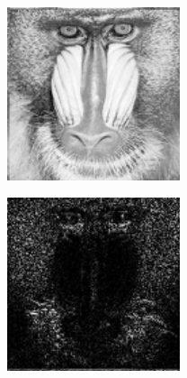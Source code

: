 \begin{figure}
\centering
        \begin{subfigure}{0.4\textwidth}\centering
                    \includegraphics[width=\linewidth]{figures/mandrill1.pdf}
       \end{subfigure}%
        \begin{subfigure}{0.4\textwidth}\centering
                    \includegraphics[width=\linewidth]{figures/mandrill2.pdf}

\end{subfigure}
\end{figure}
